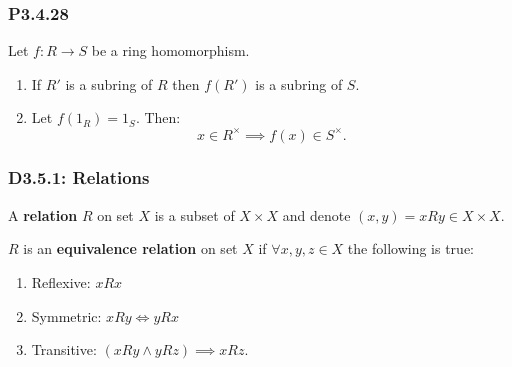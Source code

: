 \documentclass{article}
\begin{document}
\begin{multicols*}{3}
\subsubsection*{P3.4.28}
Let $f:R\rightarrow S$ be a ring homomorphism.
\begin{enumerate}
    \item If $R'$ is a subring of $R$ then
    $f(R')$ is a subring of $S$.

    \item Let $f(1_R)=1_S$. Then:
    $$x\in R^{\times}\implies f(x)\in S^{\times}.$$
\end{enumerate}

\subsubsection*{D3.5.1: Relations}
A \textbf{relation} $R$ on set $X$ is a subset of $X\times X$
and denote $(x,y)=xRy\in X\times X$.

$R$ is an \textbf{equivalence relation} on set $X$
if $\forall x,y,z\in X$ the following is true:
\begin{enumerate}
    \item Reflexive: $xRx$
    \item Symmetric: $xRy\iff yRx$
    \item Transitive:
    $(xRy\land yRz)\implies xRz$.
\end{enumerate}


\end{multicols*}
\end{document}
